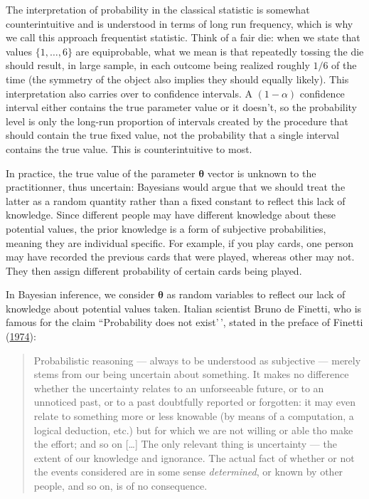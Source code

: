 \documentclass[
  11pt,
  letterpaper,
]{scrbook}
\theoremstyle{definition}
\theoremstyle{remark}
\begin{document}
The interpretation of probability in the classical statistic is somewhat
counterintuitive and is understood in terms of long run frequency, which
is why we call this approach frequentist statistic. Think of a fair die:
when we state that values \(\{1, \ldots, 6\}\) are equiprobable, what we
mean is that repeatedly tossing the die should result, in large sample,
in each outcome being realized roughly \(1/6\) of the time (the symmetry
of the object also implies they should equally likely). This
interpretation also carries over to confidence intervals. A
\((1-\alpha)\) confidence interval either contains the true parameter
value or it doesn't, so the probability level is only the long-run
proportion of intervals created by the procedure that should contain the
true fixed value, not the probability that a single interval contains
the true value. This is counterintuitive to most.

In practice, the true value of the parameter \(\boldsymbol{\theta}\)
vector is unknown to the practitionner, thus uncertain: Bayesians would
argue that we should treat the latter as a random quantity rather than a
fixed constant to reflect this lack of knowledge. Since different people
may have different knowledge about these potential values, the prior
knowledge is a form of subjective probabilities, meaning they are
individual specific. For example, if you play cards, one person may have
recorded the previous cards that were played, whereas other may not.
They then assign different probability of certain cards being played.

In Bayesian inference, we consider \(\boldsymbol{\theta}\) as random
variables to reflect our lack of knowledge about potential values taken.
Italian scientist Bruno de Finetti, who is famous for the claim
``Probability does not exist'\,', stated in the preface of Finetti
(\protect\hyperlink{ref-deFinetti:1974}{1974}):

\begin{quote}
Probabilistic reasoning --- always to be understood as subjective ---
merely stems from our being uncertain about something. It makes no
difference whether the uncertainty relates to an unforseeable future, or
to an unnoticed past, or to a past doubtfully reported or forgotten: it
may even relate to something more or less knowable (by means of a
computation, a logical deduction, etc.) but for which we are not willing
or able tho make the effort; and so on {[}\ldots{]} The only relevant
thing is uncertainty --- the extent of our knowledge and ignorance. The
actual fact of whether or not the events considered are in some sense
\emph{determined}, or known by other people, and so on, is of no
consequence.
\end{quote}
\end{document}
